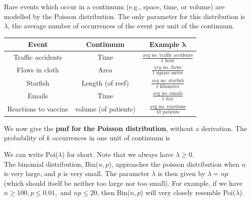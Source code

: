 \noindent Rare events which occur in a continuum (e.g., space, time, or volume) are modelled by the Poisson distribution. The only parameter for this distribution is $\lambda$, the average number of occurrences of the event per unit of the continuum. \smallskip \label{lambda poisson}

\begin{center}
\begin{tabular}{|c|c|c|} \hline
 \textbf{Event}	& \textbf{Continuum} & \textbf{Example $\boldsymbol{\lambda}$} \\ \hline
Traffic accidents & Time 	      & $\frac{\text{avg no. traffic accidents}}{\text{1 hour}}$ \\ \hline
Flaws in cloth 	 &  Area	     & $\frac{\text{avg no. flaws}}{\text{1 square meter}}$ \\ \hline
Starfish 		 & Length (of reef) & $\frac{\text{avg no. starfish}}{\text{1 kilometer}}$ \\ \hline
Emails 		 & Time 	     & $\frac{\text{avg no. emails}}{\text{1 day}}$ \\ \hline
Reactions to vaccine & volume (of patients) & $\frac{\text{avg no. reactions}}{\text{10 patients}}$ \\ \hline
\end{tabular}
\end{center}
We now give the \textbf{pmf for the Poisson distribution}, without a derivation. The probability of $k$ occurrences in one unit of continuum is \label{poi(lambda)}

  	\bigskip
	
	\hfil{}
	\bigskip
	\bigskip

\noindent We can write Poi($\lambda$) for short. Note that we always have $\lambda \geq 0$. \\

\noindent The binomial distribution, Bin($n,p$), approaches the poisson distribution when $n$ is very large, and $p$ is very small. The parameter $\lambda$ is then given by $\lambda = np$ (which should itself be neither too large nor too small). For example, if we have $n \geq 100, p \leq 0.01,$ and $np \leq 20$, then Bin($n,p$) will very closely resemble Poi($\lambda$). \\

